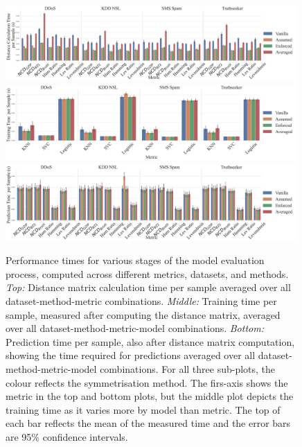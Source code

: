 \documentclass[preprint,12pt]{article}
\begin{document}
\begin{figure}[H]
    \centering
    \includegraphics[width=0.99\textwidth]{images/distance_time_vs_symmetry.pdf}
    \hfill
    \includegraphics[width=0.99\textwidth]{images/train_time_vs_symmetry.pdf}
    \hfill
    \includegraphics[width=0.99\textwidth]{images/pred_time_vs_symmetry.pdf}
    \caption{
        Performance times for various stages of the model evaluation process, computed across different metrics, datasets, and methods. \textit{Top:} Distance matrix calculation time per sample averaged over all dataset-method-metric combinations. \textit{Middle:} Training time per sample, measured after computing the distance matrix, averaged over all dataset-method-metric-model combinations. \textit{Bottom:} Prediction time per sample, also after distance matrix computation, showing the time required for predictions averaged over all dataset-method-metric-model combinations. For all three sub-plots, the colour reflects the symmetrisation method. The firs-axis shows the metric in the top and bottom plots, but the middle plot depicts the training time as it varies more by model than metric.
        The top of each bar reflects the mean of the measured time and the error bars are 95\% confidence intervals.
    }
    \label{fig:times}
\end{figure}
\end{document}
